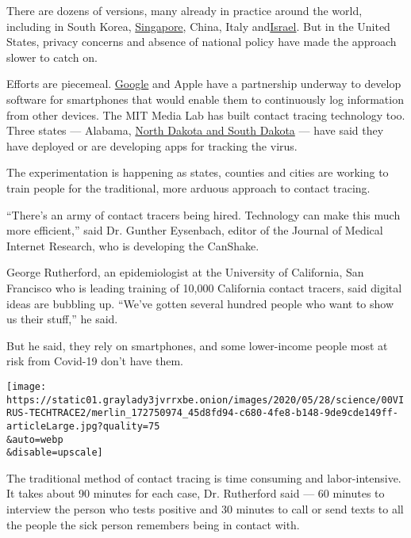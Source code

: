 There are dozens of versions, many already in practice around the world,
including in South Korea,
\href{https://www.reuters.com/article/us-health-coronavirus-singapore-technolo-idUSKBN2171ZQ}{Singapore},
China, Italy
and\href{https://www.nytimes3xbfgragh.onion/2020/03/16/world/middleeast/israel-coronavirus-cellphone-tracking.html}{Israel}.
But in the United States, privacy concerns and absence of national
policy have made the approach slower to catch on.

Efforts are piecemeal.
\href{https://www.nytimes3xbfgragh.onion/2020/07/20/technology/google-covid-tracker-app.html}{Google}
and Apple have a partnership underway to develop software for
smartphones that would enable them to continuously log information from
other devices. The MIT Media Lab has built contact tracing technology
too. Three states --- Alabama,
\href{https://www.nytimes3xbfgragh.onion/2020/04/29/business/coronavirus-cellphone-apps-contact-tracing.html}{North
Dakota and South Dakota} --- have said they have deployed or are
developing apps for tracking the virus.

The experimentation is happening as states, counties and cities are
working to train people for the traditional, more arduous approach to
contact tracing.

``There's an army of contact tracers being hired. Technology can make
this much more efficient,'' said Dr. Gunther Eysenbach, editor of the
Journal of Medical Internet Research, who is developing the CanShake.

George Rutherford, an epidemiologist at the University of California,
San Francisco who is leading training of 10,000 California contact
tracers, said digital ideas are bubbling up. ``We've gotten several
hundred people who want to show us their stuff,'' he said.

But he said, they rely on smartphones, and some lower-income people most
at risk from Covid-19 don't have them.

\texttt{[image: https://static01.graylady3jvrrxbe.onion/images/2020/05/28/science/00VIRUS-TECHTRACE2/merlin\_172750974\_45d8fd94-c680-4fe8-b148-9de9cde149ff-articleLarge.jpg?quality=75\\\&auto=webp\\\&disable=upscale]}

The traditional method of contact tracing is time consuming and
labor-intensive. It takes about 90 minutes for each case, Dr. Rutherford
said --- 60 minutes to interview the person who tests positive and 30
minutes to call or send texts to all the people the sick person
remembers being in contact with.

